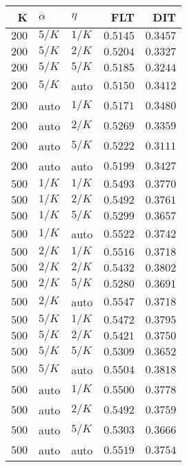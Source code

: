 \begin{table}
\begin{spacing}{1.2}
{\begin{tabular}{rll|rr}
\bottomrule
\end{tabular}
} \hfill \parbox{.45\linewidth}{\centering \begin{tabular}{rll|rr}
\toprule
    K &  $\alpha$ &    $\eta$ &           FLT &           DIT \\
\midrule
$200$ &  $5/K$ &  $1/K$ &      $0.5145$ &      $0.3457$ \\
$200$ &  $5/K$ &  $2/K$ &      $0.5204$ &      $0.3327$ \\
$200$ &  $5/K$ &  $5/K$ &      $0.5185$ &      $0.3244$ \\
$200$ &  $5/K$ &   auto &      $0.5150$ &      $0.3412$ \\
$200$ &   auto &  $1/K$ &      $0.5171$ &      $0.3480$ \\
$200$ &   auto &  $2/K$ &      $0.5269$ &      $0.3359$ \\
$200$ &   auto &  $5/K$ &      $0.5222$ &      $0.3111$ \\
$200$ &   auto &   auto &      $0.5199$ &      $0.3427$ \\
$500$ &  $1/K$ &  $1/K$ &      $0.5493$ &      $0.3770$ \\
$500$ &  $1/K$ &  $2/K$ &      $0.5492$ &      $0.3761$ \\
$500$ &  $1/K$ &  $5/K$ &      $0.5299$ &      $0.3657$ \\
$500$ &  $1/K$ &   auto &      $0.5522$ &      $0.3742$ \\
$500$ &  $2/K$ &  $1/K$ &      $0.5516$ &      $0.3718$ \\
$500$ &  $2/K$ &  $2/K$ &      $0.5432$ &      $0.3802$ \\
$500$ &  $2/K$ &  $5/K$ &      $0.5280$ &      $0.3691$ \\
$500$ &  $2/K$ &   auto & $\bm{0.5547}$ &      $0.3718$ \\
$500$ &  $5/K$ &  $1/K$ &      $0.5472$ &      $0.3795$ \\
$500$ &  $5/K$ &  $2/K$ &      $0.5421$ &      $0.3750$ \\
$500$ &  $5/K$ &  $5/K$ &      $0.5309$ &      $0.3652$ \\
$500$ &  $5/K$ &   auto &      $0.5504$ & $\bm{0.3818}$ \\
$500$ &   auto &  $1/K$ &      $0.5500$ &      $0.3778$ \\
$500$ &   auto &  $2/K$ &      $0.5492$ &      $0.3759$ \\
$500$ &   auto &  $5/K$ &      $0.5303$ &      $0.3666$ \\
$500$ &   auto &   auto &      $0.5519$ &      $0.3754$ \\
\bottomrule
\end{tabular}
}
\end{spacing}
\end{table}
